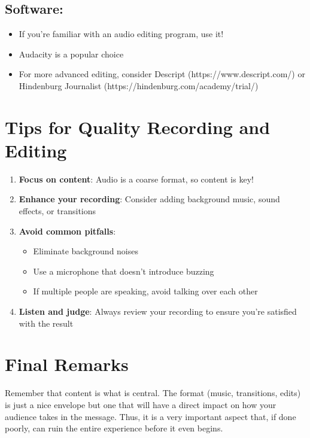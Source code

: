 \documentclass[
  letterpaper,
  DIV=11,
  numbers=noendperiod]{scrreprt}
\providecommand{\tightlist}{%
  \setlength{\itemsep}{0pt}\setlength{\parskip}{0pt}}\usepackage{longtable,booktabs,array}
\begin{document}
\subsection{Software:}\label{software-1}

\begin{itemize}
\tightlist
\item
  If you're familiar with an audio editing program, use it!
\item
  Audacity is a popular choice
\item
  For more advanced editing, consider Descript
  (https://www.descript.com/) or Hindenburg Journalist
  (https://hindenburg.com/academy/trial/)
\end{itemize}

\section{Tips for Quality Recording and
Editing}\label{tips-for-quality-recording-and-editing}

\begin{enumerate}
\def\labelenumi{\arabic{enumi}.}
\tightlist
\item
  \textbf{Focus on content}: Audio is a coarse format, so content is
  key!
\item
  \textbf{Enhance your recording}: Consider adding background music,
  sound effects, or transitions
\item
  \textbf{Avoid common pitfalls}:

  \begin{itemize}
  \tightlist
  \item
    Eliminate background noises
  \item
    Use a microphone that doesn't introduce buzzing
  \item
    If multiple people are speaking, avoid talking over each other
  \end{itemize}
\item
  \textbf{Listen and judge}: Always review your recording to ensure
  you're satisfied with the result
\end{enumerate}

\section{Final Remarks}\label{final-remarks-1}

Remember that content is what is central. The format (music,
transitions, edits) is just a nice envelope but one that will have a
direct impact on how your audience takes in the message. Thus, it is a
very important aspect that, if done poorly, can ruin the entire
experience before it even begins.
\end{document}
